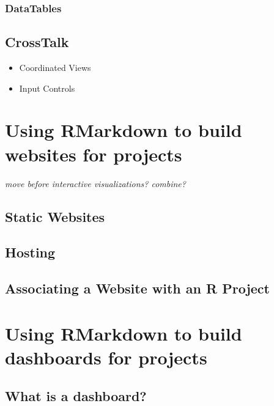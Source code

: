 \documentclass[
]{krantz}
\providecommand{\tightlist}{%
  \setlength{\itemsep}{0pt}\setlength{\parskip}{0pt}}
\begin{document}
\hypertarget{datatables}{%
\subsection{DataTables}\label{datatables}}

\hypertarget{crosstalk}{%
\section{CrossTalk}\label{crosstalk}}

\begin{itemize}
\tightlist
\item
  Coordinated Views
\item
  Input Controls
\end{itemize}

\hypertarget{rmarkdown-websites}{%
\chapter{Using RMarkdown to build websites for projects}\label{rmarkdown-websites}}

\emph{move before interactive visualizations? combine?}

\hypertarget{static-websites}{%
\section{Static Websites}\label{static-websites}}

\hypertarget{hosting}{%
\section{Hosting}\label{hosting}}

\hypertarget{associating-a-website-with-an-r-project}{%
\section{Associating a Website with an R Project}\label{associating-a-website-with-an-r-project}}

\hypertarget{rmarkdown-dashboards}{%
\chapter{Using RMarkdown to build dashboards for projects}\label{rmarkdown-dashboards}}

\hypertarget{what-is-a-dashboard}{%
\section{What is a dashboard?}\label{what-is-a-dashboard}}
\end{document}
